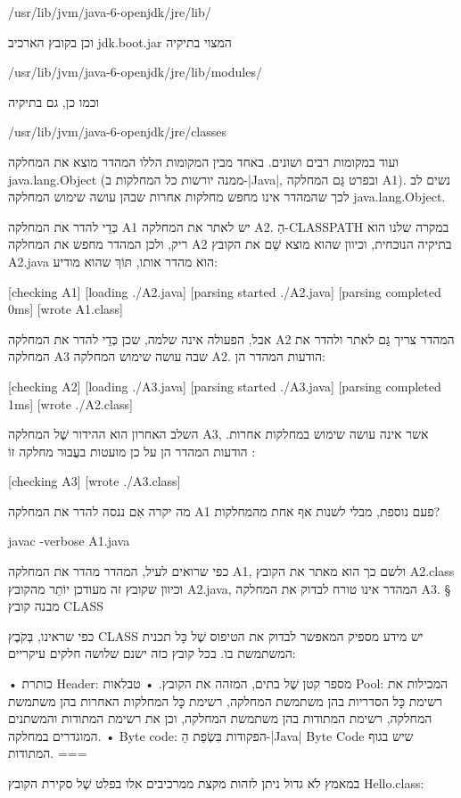 /usr/lib/jvm/java-6-openjdk/jre/lib/

וכן בקובץ הארכיב jdk.boot.jar המצוי בתיקיה

/usr/lib/jvm/java-6-openjdk/jre/lib/modules/

וכמו כן, גם בתיקיה

/usr/lib/jvm/java-6-openjdk/jre/classes

ועוד במקומות רבים ושונים. באחד מבין המקומות הללו המהדר מוצא את המחלקה
java.lang.Object (ממנה יורשות כל המחלקות ב-|Java|, ובפרט גַּם המחלקה
A1). נשים לב לכך שהמהדר אינו מחפש מחלקות אחרות שבהן עושה שימוש המחלקה
java.lang.Object.

כְּדֵי להדר את המחלקה A1 יש לאתר את המחלקה A2. הַ-CLASSPATH
במקרה שלנו הוא ריק, ולכן המהדר מחפש את המחלקה A2 בתיקיה הנוכחית, וכיוון
שהוא מוצא שֵׁם את הקובץ A2.java הוא מהדר אותו, תּוֹךְ שהוא מודיע:

[checking A1]
[loading ./A2.java]
[parsing started ./A2.java]
[parsing completed 0ms]
[wrote A1.class]

אבל, הפעולה אינה שלמה, שכן כְּדֵי להדר את המחלקה A2 המהדר צריך גַּם
לאתר ולהדר את המחלקה A3 שבה עושה שימוש המחלקה A2. הודעות המהדר הן:

[checking A2]
[loading ./A3.java]
[parsing started ./A3.java]
[parsing completed 1ms]
[wrote ./A2.class]

השלב האחרון הוא ההידור שֶׁל המחלקה A3, אשר אינה עושה שימוש במחלקות
אחרות. הודעות המהדר הן על כן מועטות בעֲבוּר מחלקה זוֹ :

[checking A3]
[wrote ./A3.class]

מה יקרה אִם ננסה להדר את המחלקה A1 פעם נוספת, מבלי לשנות אף אחת
מהמחלקות?

javac -verbose A1.java
\END

כפי שרואים לעיל, המהדר מהדר את המחלקה A1, ולשם כך הוא מאתר את הקובץ
A2.class וכיוון שקובץ זה מעודכן יוֹתֵר מהקובץ A2.java, המהדר אינו טורח לבדוק את
המחלקה A3.
§ מבנה קובץ CLASS

כפי שראינו, בְּקֹבֶץ CLASS יש מידע מספיק המאפשר לבדוק את הטיפוס שֶׁל כָּל
תכנית המשתמשת בו. בכל קובץ כזה ישנם שלושה חלקים עיקריים:

• כותרת Header: מספר קטן שֶׁל בתים, המזהה את הקובץ.
• טבלאות Pool: המכילות את רשימת כָּל הסדריות בהן משתמשת המחלקה, רשימת
כָּל המחלקות האחרות בהן משתמשת המחלקה, רשימת המתודות בהן משתמשת
המחלקה, וכן את רשימת המתודות והמשתנים המוגדרים במחלקה.
• Byte code: הפקודות בִּשְׂפַת הַ-|Java| Byte Code שיש בגוף המתודות.
===

במאמץ לֹא גדול ניתן לזהות מקצת ממרכיבים אלו בפלט שֶׁל סקירת הקובץ
Hello.class:

